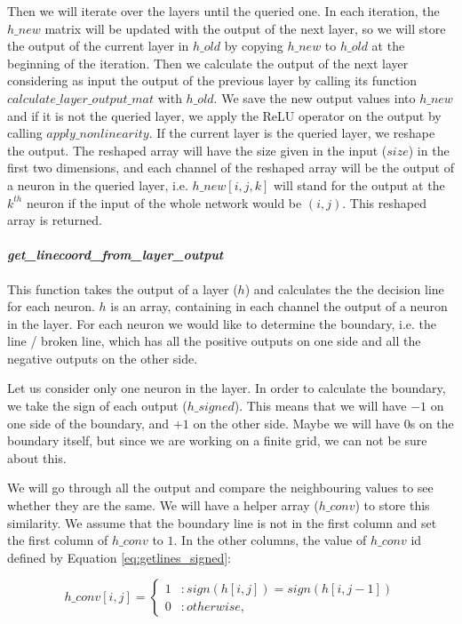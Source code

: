 \documentclass[a4paper]{article}
\begin{document}
Then we will iterate over the layers until the queried one.
In each iteration, the $h\_new$ matrix will be updated with the output of the next layer, so we will store the output of the current layer in $h\_old$ by copying $h\_new$ to $h\_old$ at the beginning of the iteration.
Then we calculate the output of the next layer considering as input the output of the previous layer by calling its function $calculate\_layer\_output\_mat$ with $h\_old$. We save the new output values into $h\_new$ and if it is not the queried layer, we apply the ReLU operator on the output by calling $apply\_nonlinearity$. If the current layer is the queried layer, we reshape the output. The reshaped array will have the size given in the input ($size$) in the first two dimensions, and each channel of the reshaped array will be the output of a neuron in the queried layer, i.e. $h\_new[i,j,k]$ will stand for the output at the $k^{th}$ neuron if the input of the whole network would be $(i,j)$. This reshaped array is returned.

\paragraph{\textit{get\_linecoord\_from\_layer\_output}}This function takes the output of a layer ($h$) and calculates the the decision line for each neuron. $h$ is an array, containing in each channel the output of a neuron in the layer. For each neuron we would like to determine the boundary, i.e. the line / broken line, which has all the positive outputs on one side and all the negative outputs on the other side. 

Let us consider only one neuron in the layer. In order to calculate the boundary, we take the sign of each output ($h\_signed$). This means that we will have $-1$ on one side of the boundary, and $+1$ on the other side. Maybe we will have $0$s on the boundary itself, but since we are working on a finite grid, we can not be sure about this.

We will go through all the output and compare the neighbouring values to see whether they are the same. We will have a helper array ($h\_conv$) to store this similarity. We assume that the boundary line is not in the first column and set the first column of $h\_conv$ to $1$. In the other columns, the value of $h\_conv$ id defined by Equation \ref{eq:getlines_signed}:

\begin{equation}
h\_conv[i,j]=\left\{
  \begin{array}{lr}
  	1 & : sign(h[i,j])=sign(h[i,j-1])\\
    0 & : otherwise,
  \end{array}
\right.
\label{eq:getlines_signed}
\end{equation}
\end{document}
